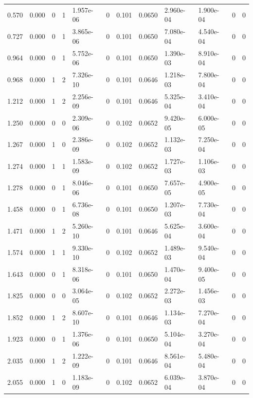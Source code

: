 \documentclass[preview]{standalone}
\begin{document}
{{\begin{tabular}{L{1.2cm}C{1.2cm} C{0.3cm}C{0.5cm} C{1.4cm}C{1.4cm} C{1.4cm}C{1.4cm} C{1.6cm}C{1.6cm} C{1.6cm}C{1.6cm}}
  0.570  &  0.000  & 0     &  1 &  1.957e-06  & 0  &  0.101&   0.0650& 2.960e-04 & 1.900e-04   &  0 & 0  \\ 
  0.727  &  0.000  & 0     &  1 &  3.865e-06  & 0  &  0.101&   0.0650& 7.080e-04 & 4.540e-04   &  0 & 0  \\ 
  0.964  &  0.000  & 0     &  1 &  5.752e-06  & 0  &  0.101&   0.0650& 1.390e-03 & 8.910e-04   &  0 & 0  \\ 
  0.968  &  0.000  & 1     &  2 &  7.326e-10  & 0  &  0.101&   0.0646& 1.218e-03 & 7.800e-04   &  0 & 0  \\ 
  1.212  &  0.000  & 1     &  2 &  2.256e-09  & 0  &  0.101&   0.0646& 5.325e-04 & 3.410e-04   &  0 & 0  \\ 
  1.250  &  0.000  & 0     &  0 &  2.309e-06  & 0  &  0.102&   0.0652& 9.420e-05 & 6.000e-05   &  0 & 0  \\ 
  1.267  &  0.000  & 1     &  0 &  2.386e-09  & 0  &  0.102&   0.0652& 1.132e-03 & 7.250e-04   &  0 & 0  \\ 
  1.274  &  0.000  & 1     &  1 &  1.583e-09  & 0  &  0.102&   0.0652& 1.727e-03 & 1.106e-03   &  0 & 0  \\ 
  1.278  &  0.000  & 0     &  1 &  8.046e-06  & 0  &  0.101&   0.0650& 7.657e-05 & 4.900e-05   &  0 & 0  \\ 
  1.458  &  0.000  & 0     &  1 &  6.736e-08  & 0  &  0.101&   0.0650& 1.207e-03 & 7.730e-04   &  0 & 0  \\ 
  1.471  &  0.000  & 1     &  2 &  5.260e-10  & 0  &  0.101&   0.0646& 5.625e-04 & 3.600e-04   &  0 & 0  \\ 
  1.574  &  0.000  & 1     &  1 &  9.330e-10  & 0  &  0.102&   0.0652& 1.489e-03 & 9.540e-04   &  0 & 0  \\ 
  1.643  &  0.000  & 0     &  1 &  8.318e-06  & 0  &  0.101&   0.0650& 1.470e-04 & 9.400e-05   &  0 & 0  \\ 
  1.825  &  0.000  & 0     &  0 &  3.064e-05  & 0  &  0.102&   0.0652& 2.272e-03 & 1.456e-03   &  0 & 0  \\ 
  1.852  &  0.000  & 1     &  2 &  8.607e-10  & 0  &  0.101&   0.0646& 1.134e-03 & 7.270e-04   &  0 & 0  \\ 
  1.923  &  0.000  & 0     &  1 &  1.376e-06  & 0  &  0.101&   0.0650& 5.104e-04 & 3.270e-04   &  0 & 0  \\ 
  2.035  &  0.000  & 1     &  2 &  1.222e-09  & 0  &  0.101&   0.0646& 8.561e-04 & 5.480e-04   &  0 & 0  \\ 
  2.055  &  0.000  & 1     &  0 &  1.183e-09  & 0  &  0.102&   0.0652& 6.039e-04 & 3.870e-04   &  0 & 0  \\ 

\end{tabular}}}
\end{document}
